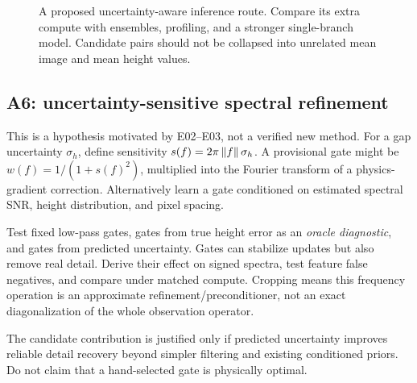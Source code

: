 \begin{figure}[htbp]\centering
{}
\caption{A proposed uncertainty-aware inference route. Compare its extra compute with ensembles, profiling, and a stronger single-branch model. Candidate pairs should not be collapsed into unrelated mean image and mean height values.}
\end{figure}

\subsection{A6: uncertainty-sensitive spectral refinement}
This is a hypothesis motivated by E02--E03, not a verified new method. For a gap uncertainty $\sigma_h$, define sensitivity $s(f)=2\pi\left\lVert f\right\rVert\sigma_h$. A provisional gate might be $w(f)=1/(1+s(f)^2)$, multiplied into the Fourier transform of a physics-gradient correction. Alternatively learn a gate conditioned on estimated spectral SNR, height distribution, and pixel spacing.

Test fixed low-pass gates, gates from true height error as an \emph{oracle diagnostic}, and gates from predicted uncertainty. Gates can stabilize updates but also remove real detail. Derive their effect on signed spectra, test feature false negatives, and compare under matched compute. Cropping means this frequency operation is an approximate refinement/preconditioner, not an exact diagonalization of the whole observation operator.

The candidate contribution is justified only if predicted uncertainty improves reliable detail recovery beyond simpler filtering and existing conditioned priors. Do not claim that a hand-selected gate is physically optimal.

